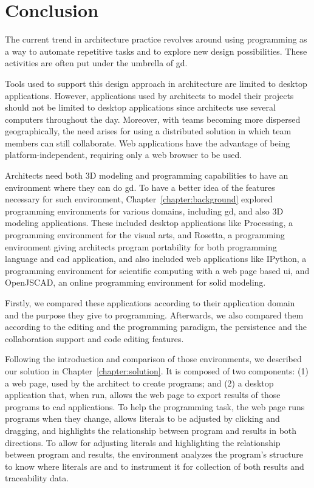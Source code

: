 
\chapter{Conclusion}
\label{chapter:conclusion}
The current trend in architecture practice revolves around using programming as a way to automate repetitive tasks and to explore new design possibilities.
These activities are often put under the umbrella of \acrfull{gd}.

Tools used to support this design approach in architecture are limited to desktop applications.
However, applications used by architects to model their projects should not be limited to desktop applications since architects use several computers throughout the day.
Moreover, with teams becoming more dispersed geographically, the need arises for using a distributed solution in which team members can still collaborate.
Web applications have the advantage of being platform-independent, requiring only a web browser to be used.

Architects need both 3D modeling and programming capabilities to have an environment where they can do \gls{gd}.
To have a better idea of the features necessary for such environment, Chapter~\ref{chapter:background} explored programming environments for various domains, including \gls{gd}, and also 3D modeling applications.
These included desktop applications like Processing, a programming environment for the visual arts, and Rosetta, a programming environment giving architects program portability for both programming language and \gls{cad} application, and also included web applications like IPython, a programming environment for scientific computing with a web page based \gls{ui}, and OpenJSCAD, an online programming environment for solid modeling.

Firstly, we compared these applications according to their application domain and the purpose they give to programming.
Afterwards, we also compared them according to the editing and the programming paradigm, the persistence and the collaboration support and code editing features.

Following the introduction and comparison of those environments, we described our solution in Chapter~\ref{chapter:solution}.
It is composed of two components:
(1) a web page, used by the architect to create programs;
and (2) a desktop application that, when run, allows the web page to export results of those programs to \gls{cad} applications.
To help the programming task, the web page runs programs when they change, allows literals to be adjusted by clicking and dragging, and highlights the relationship between program and results in both directions.
To allow for adjusting literals and highlighting the relationship between program and results, the environment analyzes the program's structure to know where literals are and to instrument it for collection of both results and traceability data.

